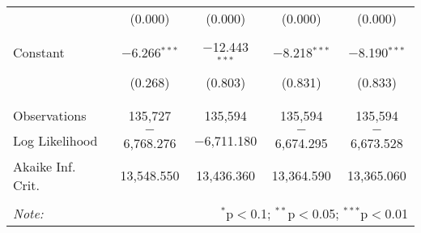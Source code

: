 \begin{table}[!htbp]
\begin{tabular}{@{\extracolsep{-5pt}}lcccc}
  & (0.000) & (0.000) & (0.000) & (0.000) \\ 
  & & & & \\ 
 Constant & $-$6.266$^{***}$ & $-$12.443$^{***}$ & $-$8.218$^{***}$ & $-$8.190$^{***}$ \\ 
  & (0.268) & (0.803) & (0.831) & (0.833) \\ 
  & & & & \\ 
\hline \\[-1.8ex] 
Observations & 135,727 & 135,594 & 135,594 & 135,594 \\ 
Log Likelihood & $-$6,768.276 & $-$6,711.180 & $-$6,674.295 & $-$6,673.528 \\ 
Akaike Inf. Crit. & 13,548.550 & 13,436.360 & 13,364.590 & 13,365.060 \\ 
\hline 
\hline \\[-1.8ex] 
\textit{Note:}  & \multicolumn{4}{r}{$^{*}$p$<$0.1; $^{**}$p$<$0.05; $^{***}$p$<$0.01} \\ 
\end{tabular} 
\end{table} 

